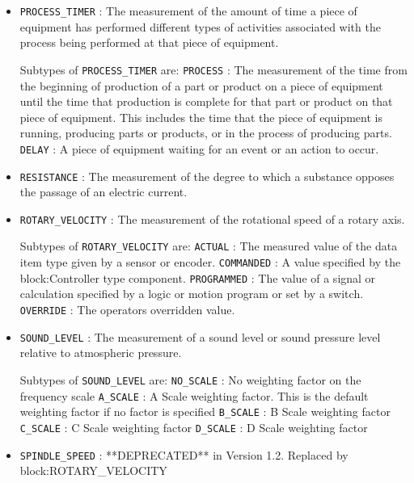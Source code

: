 \begin{itemize}
\item \texttt{PROCESS_TIMER} : The measurement of the amount of time a piece of equipment has performed different types of activities associated with the process being performed at that piece of equipment. 

Subtypes of \texttt{PROCESS_TIMER} are: 
\newline\tab \texttt{PROCESS} : The measurement of the time from the beginning of production of a part or product on a piece of equipment until the time that production is complete for that part or product on that piece of equipment.  This includes the time that the piece of equipment is running, producing parts or products, or in the process of producing parts. 
\newline\tab \texttt{DELAY} : A piece of equipment waiting for an event or an action to occur. 
\item \texttt{RESISTANCE} : The measurement of the degree to which a substance opposes the passage of an electric current. 

\item \texttt{ROTARY_VELOCITY} : The measurement of the rotational speed of a rotary axis. 

Subtypes of \texttt{ROTARY_VELOCITY} are: 
\newline\tab \texttt{ACTUAL} : The measured value of the data item type given by a sensor or encoder. 
\newline\tab \texttt{COMMANDED} : A value specified by the {block:Controller} type component. 
\newline\tab \texttt{PROGRAMMED} : The value of a signal or calculation specified by a logic or motion program or set by a switch. 
\newline\tab \texttt{OVERRIDE} : The operators overridden value. 
\item \texttt{SOUND_LEVEL} : The measurement of a sound level or sound pressure level relative to atmospheric pressure. 

Subtypes of \texttt{SOUND_LEVEL} are: 
\newline\tab \texttt{NO_SCALE} : No weighting factor on the frequency scale 
\newline\tab \texttt{A_SCALE} : A Scale weighting factor.   This is the default weighting factor if no factor is specified 
\newline\tab \texttt{B_SCALE} : B Scale weighting factor 
\newline\tab \texttt{C_SCALE} : C Scale weighting factor 
\newline\tab \texttt{D_SCALE} : D Scale weighting factor 
\item \texttt{SPINDLE_SPEED} : **DEPRECATED** in Version 1.2.  Replaced by {block:ROTARY_VELOCITY} 


\end{itemize}
